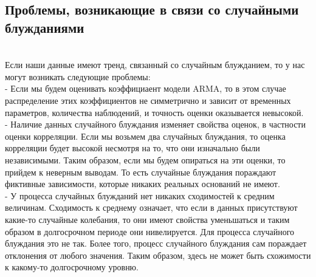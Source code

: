 \documentclass{article}
\begin{document}
\begin{itemize}
    \subsection{Проблемы, возникающие в связи со случайными блужданиями}
    \\ Если наши данные имеют тренд, связанный со случайным блужданием, то у нас могут возникать следующие проблемы:
    \\ - Если мы будем оценивать коэффициаент модели ARMA, то в этом случае распределение этих коэффициентов не симметрично и зависит от временных параметров, количества наблюдений, и точность оценки оказывается невысокой.
    \\ - Наличие данных случайного блуждания изменяет свойства оценок, в частности оценки корреляции. Если мы возьмем два случайных блуждания, то оценка корреляции будет высокой несмотря на то, что они изначально были независимыми. Таким образом, если мы будем опираться на эти оценки, то прийдем к неверным выводам. То есть случайные блуждания пораждают фиктивные зависимости, которые никаких реальных оснований не имеют.
    \\ - У процесса случайных блужданий нет никаких сходимостей к средним величинам. Сходимость к среднему означает, что если в данных присутствуют какие-то случайные колебания, то они имеют свойства уменьшаться и таким образом в долгосрочном периоде они нивелируется. Для процесса случайного блуждания это не так. Более того, процесс случайного блуждания сам пораждает отклонения от любого значения. Таким образом, здесь не может быть схожимости к какому-то долгосрочному уровню.
    \newpage

\end{itemize}
\end{document}
